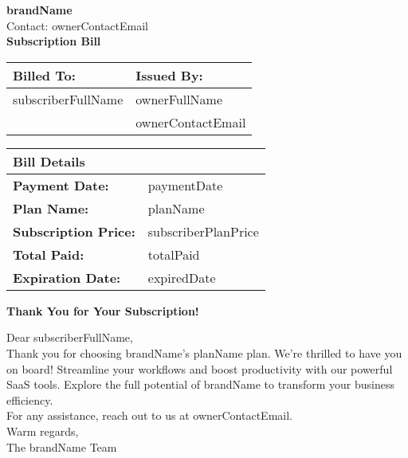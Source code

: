 \documentclass[a4paper,12pt]{article}
\begin{document}
    \begin{center}
        \textbf{\LARGE {{{brandName}}}} \\[0.2cm] %
        \small{Contact: {{{ownerContactEmail}}}} \\[0.5cm] %
        \textbf{\large Subscription Bill} \\[0.3cm]
    \end{center}

    \begin{tabular}{l l}
        \toprule
        \textbf{Billed To:} & \textbf{Issued By:} \\
        \midrule
        {{subscriberFullName}} & {{ownerFullName}} \\
        & {{ownerContactEmail}} \\
        \bottomrule
    \end{tabular}

    \vspace{0.5cm}

    \begin{tabular}{l l}
        \toprule
        \textbf{Bill Details} & \\
        \midrule
        \textbf{Payment Date:} & {{paymentDate}} \\
        \textbf{Plan Name:} & {{{planName}}} \\
        \textbf{Subscription Price:} & {{subscriberPlanPrice}} \\
        \textbf{Total Paid:} & {{totalPaid}} \\
        \textbf{Expiration Date:} & {{expiredDate}} \\
        \bottomrule
    \end{tabular}

    \vspace{0.5cm}

    \begin{center}
        \textbf{\color{headerblue}Thank You for Your Subscription!} \\[0.2cm]
    \end{center}
    Dear {{subscriberFullName}}, \\

    Thank you for choosing {{brandName}}'s {{planName}} plan. We're thrilled to have you on board! Streamline your workflows and boost productivity with our powerful SaaS tools. Explore the full potential of {{brandName}} to transform your business efficiency. \\

    For any assistance, reach out to us at {{ownerContactEmail}}. \\

    Warm regards, \\
    The {{brandName}} Team
\end{document}
